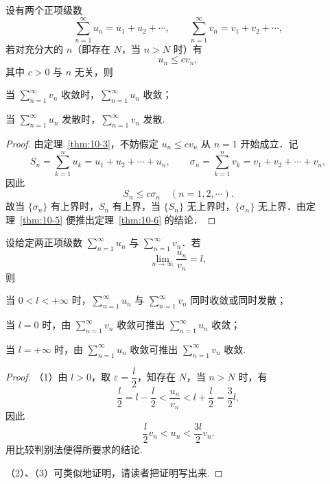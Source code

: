 \begin{theorem}[比较判别法]\label{thm:10-6}
设有两个正项级数
\[
\sum_{n=1}^{\infty}u_{n}=u_{1}+u_{2}+\cdots,\qquad
\sum_{n=1}^{\infty}v_{n}=v_{1}+v_{2}+\cdots,
\]
若对充分大的 $n$（即存在 $N$，当 $n>N$ 时）有
\[
u_{n}\leqslant cv_{n},
\]
其中 $c>0$ 与 $n$ 无关，则
\begin{ziti}
\item 当 $\sum_{n=1}^{\infty}v_{n}$ 收敛时，$\sum_{n=1}^{\infty}u_{n}$ 收敛；
\item 当 $\sum_{n=1}^{\infty}u_{n}$ 发散时，$\sum_{n=1}^{\infty}v_{n}$ 发散.
\end{ziti}
\end{theorem}

\begin{proof}
由定理~\ref{thm:10-3}，不妨假定 $u_{n}\leqslant cv_{n}$ 从 $n=1$ 开始成立．记
\[
S_{n}=\sum_{k=1}^{n}u_{k}=u_{1}+u_{2}+\cdots+u_{n},\qquad
\sigma_{n}=\sum_{k=1}^{n}v_{k}=v_{1}+v_{2}+\cdots+v_{n},
\]
因此
\[
S_{n}\leqslant c\sigma_{n}\quad(n=1,2,\cdots).
\]
故当 $\{\sigma_n\}$ 有上界时，$S_n$ 有上界，当 $\{S_n\}$ 无上界时，$\{\sigma_n\}$ 无上界．由定理~\ref{thm:10-5} 便推出定理~\ref{thm:10-6} 的结论．
\end{proof}

\begin{theorem}[比较判别法的极限形式]\label{thm:10-7}
设给定两正项级数 $\sum_{n=1}^{\infty}u_{n}$ 与 $\sum_{n=1}^{\infty}v_{n}$．若
\[
\lim_{n\to\infty}\frac{u_{n}}{v_{n}}=l,
\]
则
\begin{ziti}
\item 当 $0<l<+\infty$ 时，$\sum_{n=1}^{\infty}u_{n}$ 与 $\sum_{n=1}^{\infty}v_{n}$ 同时收敛或同时发散；
\item 当 $l=0$ 时，由 $\sum_{n=1}^{\infty}v_{n}$ 收敛可推出 $\sum_{n=1}^{\infty}u_{n}$ 收敛；
\item 当 $l=+\infty$ 时，由 $\sum_{n=1}^{\infty}u_{n}$ 收敛可推出 $\sum_{n=1}^{\infty}v_{n}$ 收敛.
\end{ziti}
\end{theorem}

\begin{proof}
（1）由 $l>0$，取 $\varepsilon=\dfrac{l}{2}$，知存在 $N$，当 $n>N$ 时，有
\[
\frac{l}{2}=l-\frac{l}{2}<\frac{u_{n}}{v_{n}}<l+\frac{l}{2}=\frac{3}{2}l,
\]
因此
\[
\frac{l}{2}v_{n}<u_{n}<\frac{3l}{2}v_{n}.
\]
用比较判别法便得所要求的结论.

（2）、（3）可类似地证明，请读者把证明写出来.
\end{proof}

